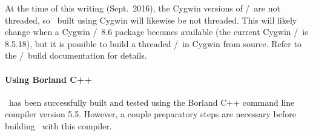 At the time of this writing (Sept.\ 2016), the Cygwin versions of
\Tcl/\Tk\ are not threaded, so \OOMMF\ built using Cygwin will
likewise be not threaded.  This will likely change when a Cygwin
\Tcl/\Tk\ 8.6 package becomes available (the current Cygwin
\Tcl/\Tk\ is 8.5.18), but it is possible to build a threaded
\Tcl/\Tk\ in Cygwin from source.  Refer to the \Tcl/\Tk\ build
documentation for details.

\paragraph{Using Borland C++}
\OOMMF\ has been successfully built and tested using the
Borland C++ command line compiler version 5.5.
However, a couple preparatory steps are necessary before building
\OOMMF\ with this compiler.
